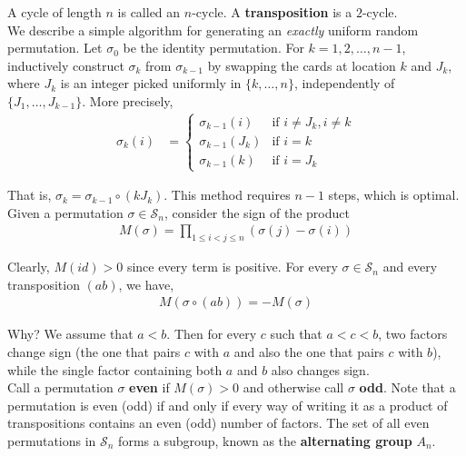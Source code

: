 \documentclass[12pt]{article}
\begin{document}
A cycle of length $n$ is called an $n$-cycle. A \textbf{transposition} is a $2$-cycle.\\

We describe a simple algorithm for generating an \textit{exactly} uniform random permutation. Let $\sigma_0$ be the identity permutation. For $k = 1, 2, \ldots, n-1$, inductively construct $\sigma_k$ from $\sigma_{k-1}$ by swapping the cards at location $k$ and $J_k$, where $J_k$ is an integer picked uniformly in $\{k, \ldots, n\}$, independently of $\{J_1, \ldots, J_{k-1}\}$. More precisely, 
\begin{align*}
\sigma_k(i) &= \begin{cases}
\sigma_{k-1}(i) & \text{if } i \neq J_k, i \neq k\\
\sigma_{k-1}(J_k) & \text{if } i = k\\
\sigma_{k-1}(k) & \text{if } i = J_k
\end{cases}
\end{align*}

That is, $\sigma_k = \sigma_{k-1} \circ (kJ_k)$. This method requires $n-1$ steps, which is optimal.\\

Given a permutation $\sigma \in \mathcal{S}_n$, consider the sign of the product
\begin{align*}
M(\sigma) = \prod_{1 \leq i < j \leq n} (\sigma(j) - \sigma(i))
\end{align*}

Clearly, $M(id) > 0$ since every term is positive. For every $\sigma \in \mathcal{S}_n$ and every transposition $(ab)$, we have,
\begin{align*}
M(\sigma \circ (ab)) = -M(\sigma)
\end{align*}

Why? We assume that $a < b$. Then for every $c$ such that $a < c < b$, two factors change sign (the one that pairs $c$ with $a$ and also the one that pairs $c$ with $b$), while the single factor containing both $a$ and $b$ also changes sign.\\

Call a permutation $\sigma$ \textbf{even} if $M(\sigma) > 0$ and otherwise call $\sigma$ \textbf{odd}. Note that a permutation is even (odd) if and only if every way of writing it as a product of transpositions contains an even (odd) number of factors. The set of all even permutations in $\mathcal{S}_n$ forms a subgroup, known as the \textbf{alternating group} $A_n$.\\
\end{document}
